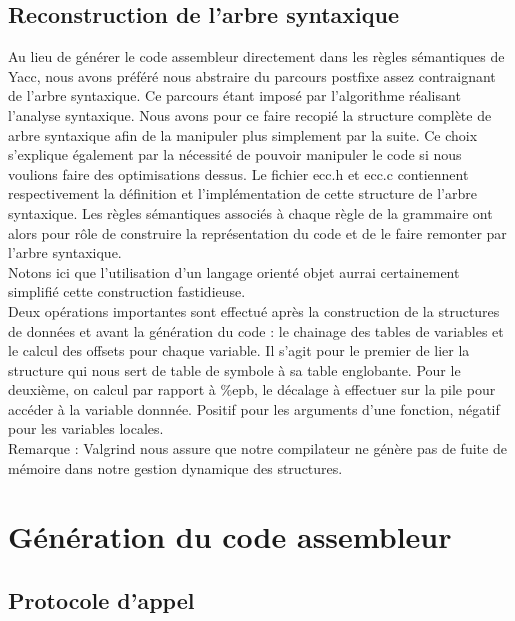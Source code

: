 \documentclass[a4paper, 11pt]{article}
\begin{document}
\subsection{Reconstruction de l'arbre syntaxique}

Au lieu de générer le code assembleur directement dans les règles sémantiques de Yacc, nous avons préféré nous abstraire du parcours 
postfixe assez contraignant de l'arbre syntaxique. Ce parcours étant imposé par l'algorithme réalisant l'analyse syntaxique. Nous avons
pour ce faire recopié la structure complète de arbre syntaxique afin de la manipuler plus simplement par la suite. Ce choix s'explique 
également par la nécessité de pouvoir manipuler le code si nous voulions faire des optimisations dessus.
Le fichier ecc.h et ecc.c contiennent respectivement la définition et l'implémentation de cette structure de l'arbre syntaxique.
Les règles sémantiques associés à chaque règle de la grammaire ont alors pour rôle de construire la représentation du code et de le faire
remonter par l'arbre syntaxique.\\

Notons ici que l'utilisation d'un langage orienté objet aurrai certainement simplifié cette construction fastidieuse.\\

Deux opérations importantes sont effectué après la construction de la structures de données et avant la génération du code : 
le chainage des tables de variables et le calcul des offsets pour chaque variable.
Il s'agit pour le premier de lier la structure qui nous sert de table de symbole à sa table englobante.
Pour le deuxième, on calcul par rapport à \%epb, le décalage à effectuer sur la pile pour accéder à la variable donnnée. Positif 
pour les arguments d'une fonction, négatif pour les variables locales.\\

Remarque : Valgrind nous assure que notre compilateur ne génère pas de fuite de mémoire dans notre gestion dynamique des structures.

\section{Génération du code assembleur}

\subsection{Protocole d'appel}
\end{document}
